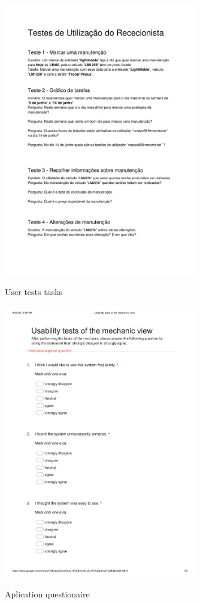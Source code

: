 \begin{figure}[h]
  \caption{User tests tasks}
  \centering
  \includegraphics[width=0.75\textwidth]{figs/chapter5/UserTestsTasks}
  \label{fig:UserTestsTasks}
\end{figure}

\begin{figure}[h]
  \caption{Aplication questionaire}
  \centering
  \includegraphics[width=0.75\textwidth]{figs/chapter5/AplicationQuestionaire}
  \label{fig:AplicationQuestionaire}
\end{figure}